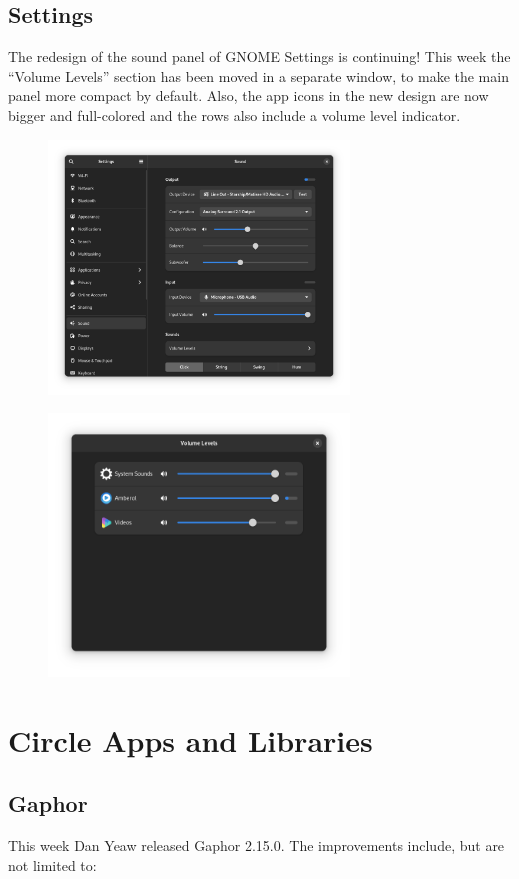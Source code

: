 \documentclass[a4paper,12pt]{report}
\begin{document}
\subsection{Settings}
The redesign of the sound panel of GNOME Settings is continuing! This week the “Volume Levels” section has been moved in a separate window, to make the main panel more compact by default. Also, the app icons in the new design are now bigger and full-colored and the rows also include a volume level indicator.
\begin{figure}[htp]
\centering
\includegraphics[width=8cm]{IKT_18_1_23@4.png}
\end{figure}
\begin{figure}[htp]
\centering
\includegraphics[width=8cm]{IKT_18_1_23@5.png}
\end{figure}
\section{Circle Apps and Libraries}
\subsection{Gaphor}
This week Dan Yeaw released Gaphor 2.15.0. The improvements include, but are not limited to:
\end{document}

